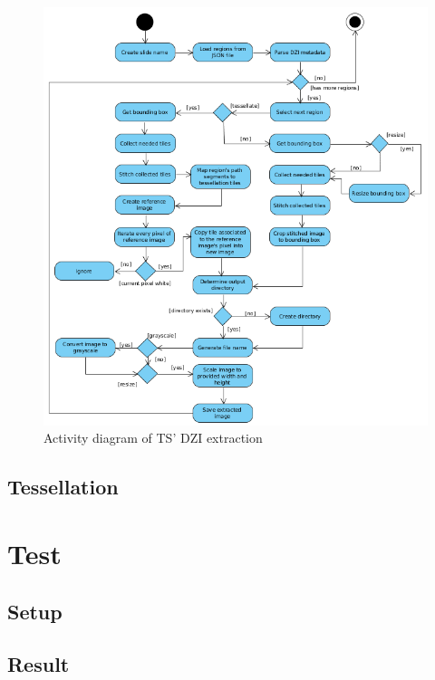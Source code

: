 \begin{figure}[H]
	\begin{center}
		\includegraphics[scale=0.4]{img/ts_dzi_uml.png}
		\caption{Activity diagram of TS' DZI extraction}
		\label{fig5_tsDziUml}
	\end{center}
\end{figure}


\subsection{Tessellation}
\label{sec5_tessellation}

\section{Test}
\subsection{Setup}
\subsection{Result}